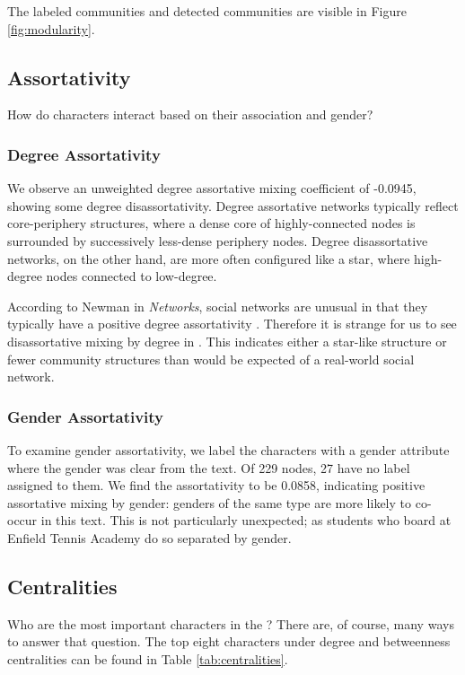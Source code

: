 The labeled communities and detected communities are visible in Figure \ref{fig:modularity}.

\subsection{Assortativity}
How do characters interact based on their association and gender?

\subsubsection{Degree Assortativity}
We observe an unweighted degree assortative mixing coefficient of -0.0945, showing some degree disassortativity. Degree assortative networks typically reflect core-periphery structures, where a dense core of highly-connected nodes is surrounded by successively less-dense periphery nodes. Degree disassortative networks, on the other hand, are more often configured like a star, where high-degree nodes connected to low-degree. 

According to Newman in {\em Networks}, social networks are unusual in that they typically have a positive degree assortativity \cite{NewmanBook}. Therefore it is strange for us to see disassortative mixing by degree in \infinitejest. This indicates either a star-like structure or fewer community structures than would be expected of a real-world social network.

\subsubsection{Gender Assortativity}
To examine gender assortativity, we label the characters with a gender attribute where the gender was clear from the text. Of 229 nodes, 27 have no label assigned to them. We find the assortativity to be 0.0858, indicating positive assortative mixing by gender: genders of the same type are more likely to co-occur in this text. This is not particularly unexpected; as students who board at Enfield Tennis Academy do so separated by gender.

\subsection{Centralities} 

Who are the most important characters in the \infinitejest? There are, of course, many ways to answer that question. The top eight characters under degree and betweenness centralities can be found in Table \ref{tab:centralities}.

